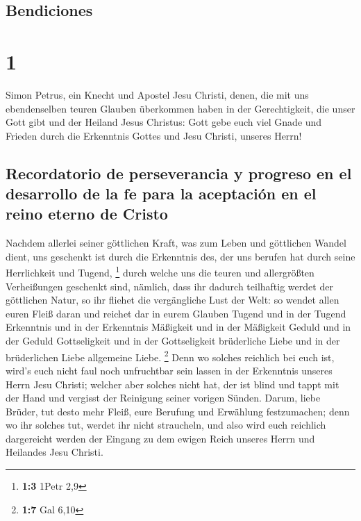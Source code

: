 \hypertarget{bendiciones}{%
\subsection{Bendiciones}\label{bendiciones}}

\hypertarget{section}{%
\section{1}\label{section}}

 Simon Petrus, ein Knecht und Apostel Jesu Christi, denen,
die mit uns ebendenselben teuren Glauben überkommen haben in der
Gerechtigkeit, die unser Gott gibt und der Heiland Jesus Christus:
 Gott gebe euch viel Gnade und Frieden durch die
Erkenntnis Gottes und Jesu Christi, unseres Herrn!

\hypertarget{recordatorio-de-perseverancia-y-progreso-en-el-desarrollo-de-la-fe-para-la-aceptaciuxf3n-en-el-reino-eterno-de-cristo}{%
\subsection{Recordatorio de perseverancia y progreso en el desarrollo de
la fe para la aceptación en el reino eterno de
Cristo}\label{recordatorio-de-perseverancia-y-progreso-en-el-desarrollo-de-la-fe-para-la-aceptaciuxf3n-en-el-reino-eterno-de-cristo}}

 Nachdem allerlei seiner göttlichen Kraft, was zum Leben
und göttlichen Wandel dient, uns geschenkt ist durch die Erkenntnis des,
der uns berufen hat durch seine Herrlichkeit und Tugend, \footnote{\textbf{1:3}
  1Petr 2,9}  durch welche uns die teuren und allergrößten
Verheißungen geschenkt sind, nämlich, dass ihr dadurch teilhaftig werdet
der göttlichen Natur, so ihr fliehet die vergängliche Lust der Welt:
 so wendet allen euren Fleiß daran und reichet dar in
eurem Glauben Tugend und in der Tugend Erkenntnis  und in
der Erkenntnis Mäßigkeit und in der Mäßigkeit Geduld und in der Geduld
Gottseligkeit  und in der Gottseligkeit brüderliche Liebe
und in der brüderlichen Liebe allgemeine Liebe. \footnote{\textbf{1:7}
  Gal 6,10}  Denn wo solches reichlich bei euch ist,
wird's euch nicht faul noch unfruchtbar sein lassen in der Erkenntnis
unseres Herrn Jesu Christi;  welcher aber solches nicht
hat, der ist blind und tappt mit der Hand und vergisst der Reinigung
seiner vorigen Sünden.  Darum, liebe Brüder, tut desto
mehr Fleiß, eure Berufung und Erwählung festzumachen; denn wo ihr
solches tut, werdet ihr nicht straucheln,  und also wird
euch reichlich dargereicht werden der Eingang zu dem ewigen Reich
unseres Herrn und Heilandes Jesu Christi.

